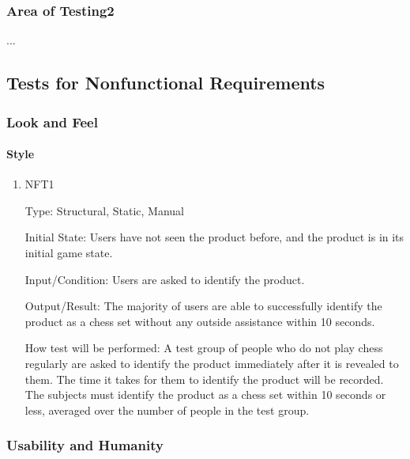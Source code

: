 \documentclass[12pt, titlepage]{article}
\begin{document}
\subsubsection{Area of Testing2}

...

\subsection{Tests for Nonfunctional Requirements}



\subsubsection{Look and Feel}
\paragraph{Style}
\begin{enumerate}
    \item{NFT1}

        Type: Structural, Static, Manual
                            
        Initial State: Users have not seen the product before, and the product is in its initial game state.
                            
        Input/Condition: Users are asked to identify the product.
                            
        Output/Result: The majority of users are able to successfully identify the product as a chess set without any outside assistance within 10 seconds.
                            
        How test will be performed: A test group of people who do not play chess regularly are asked to identify the product immediately after it is revealed to them.
            The time it takes for them to identify the product will be recorded. The subjects must identify the product as a chess set within 10 seconds or less, averaged
            over the number of people in the test group.
\end{enumerate}

\subsubsection{Usability and Humanity}
\end{document}
